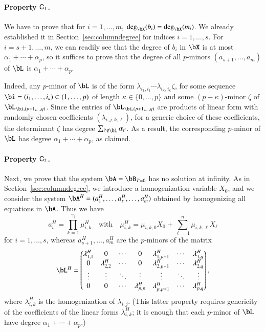 \documentclass[amsthm]{elsart}
\begin{document}
\paragraph*{Property $\mathsf{C}_1$.} We have to prove that for $i=1,\dots,m$,
$\deg_\bX(b_i)=\deg_\bX(m_i)$. We already established it in
Section~\ref{sec:columndegree} for indices $i=1,\dots,s$. For
$i=s+1,\dots,m$, we can readily see that the degree of $b_i$ in $\bX$
is at most $\alpha_1 + \cdots + \alpha_p$, so it suffices to prove
that the degree of all $p$-minors $(a_{s+1},\dots,a_m)$ of $\bL$ is
$\alpha_1 + \cdots + \alpha_p$.

Indeed, any $p$-minor of $\bL$ is of the form $\lambda_{i_1,i_1}
\cdots \lambda_{i_\kappa,i_\kappa} \zeta$, for some sequence
$\bi=(i_1,\dots,i_\kappa) \subset (1,\dots,p)$ of length $\kappa \in
\{0,\dots,p\}$ and some $(p-\kappa)$-minor $\zeta$ of $\bL_{\bi
,(p+1,\dots,q)}$.  Since the entries of $\bL_{\bi
,(p+1,\dots,q)}$ are products of linear form with randomly
chosen coefficients $(\lambda_{i,j,k,\ell})$, for a generic choice of
these coefficients, the determinant $\zeta$ has degree
$\sum_{i' \notin \bi} \alpha_{i'}$. As a result, the corresponding
$p$-minor of $\bL$ has degree $\alpha_1 + \cdots + \alpha_p$, as
claimed.

\paragraph*{Property $\mathsf{C}_2$.} Next, we prove that the system $\bA=\bB_{T=0}$ has no solution 
at infinity. As in Section~\ref{sec:columndegree}, we introduce a
homogenization variable $X_0$, and we consider the system
$\bA^H=(a_1^H,\dots,a_s^H,\dots,a_m^H)$ obtained by homogenizing all
equations in $\bA$. Thus we have
$$a_i^H=\prod_{k=1}^{\gamma_i} \mu^H_{i,k} \quad\text{with}\quad \mu^H_{i,k}=\mu_{i,k,0}X_0 + \sum_{\ell = 1}^{n}\mu_{i,k,\ell}X_\ell$$
for $i=1,\dots,s$, whereas $a_{s+1}^H,\dots,a_m^H$ are the $p$-minors of the matrix
\begin{align*}
\bL^H = \left( \begin{matrix}
\lambda^H_{1,1} & 0 & \cdots & 0 & \lambda^H_{1,p+1} & \cdots & \lambda^H_{1, q}\\
0 & \lambda^H_{2,2} & \cdots & 0 & \lambda^H_{2,p+1} & \cdots & \lambda^H_{2, q}\\
\vdots & \vdots & \ddots & \vdots & \vdots & \ddots & \vdots\\
0 & 0 & \cdots & \lambda^H_{p,p} & \lambda^H_{p,p+1} & \cdots & \lambda^H_{p, q}
\end{matrix} \right),  
\end{align*}
where $\lambda^H_{i,k}$ is the homogenization of
$\lambda_{i,j}$. (This latter property requires genericity of the
coefficients of the linear forms $\lambda^H_{i,k}$; it is enough that 
each $p$-minor of $\bL$ have degree $\alpha_1 + \cdots + \alpha_p$.)
\end{document}
